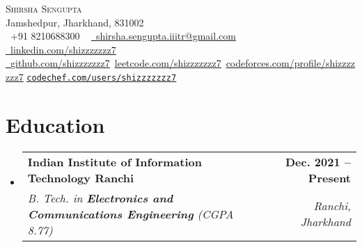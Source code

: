 \documentclass[letterpaper,11pt]{article}
\makeatletter
\newcommand{\resumeSubheading}[4]{
  \vspace{-2pt}\item
    \begin{tabular*}{1.0\textwidth}[t]{l@{\extracolsep{\fill}}r}
      \textbf{#1} & \textbf{\small #2} \\
      \textit{\small#3} & \textit{\small #4} \\
    \end{tabular*}\vspace{-7pt}
}
\newcommand{\resumeSubHeadingListStart}{\begin{itemize}[leftmargin=0.0in, label={}]}
\newcommand{\resumeSubHeadingListEnd}{\end{itemize}}
\makeatother
\begin{document}

    {\Huge \scshape Shirsha Sengupta} \\ \vspace{1pt}
    Jamshedpur, Jharkhand, 831002 \\ \vspace{1pt}
    \small \raisebox{-0.1\height}\faPhone\ +91 8210688300 ~ \href{mailto:shirsha.sengupta.iiitranchi@gmail.com}{\raisebox{-0.2\height}\faEnvelope\  \underline{shirsha.sengupta.iiitr@gmail.com}} ~
    \href{https://www.linkedin.com/in/shizzzzzzz7/}{\raisebox{-0.2\height}\faLinkedin\ \underline{linkedin.com/shizzzzzzz7}}  ~
    \href{https://github.com/Shizzzzzzz7}{\raisebox{-0.2\height}\faGithub\ \underline{github.com/shizzzzzzz7}}\
    \href{https://leetcode.com/Shizzzzzzz7/}{\underline{leetcode.com/shizzzzzzz7}}\
    \href{https://codeforces.com/profile/Shizzzzzzz7}{\underline{codeforces.com/profile/shizzzzzzz7}}
    \href{https://www.codechef.com/users/shizzzzzzz7}{\underline \texttt{\underline {codechef.com/users/shizzzzzzz7}}}
    \vspace{-8pt}


\section{Education}
  \resumeSubHeadingListStart
    \resumeSubheading
      {Indian Institute of Information Technology Ranchi}{Dec. 2021 -- Present}
      {B. Tech. in \textbf{Electronics and Communications Engineering} (CGPA 8.77)}{Ranchi, Jharkhand}
  \resumeSubHeadingListEnd

\end{document}
